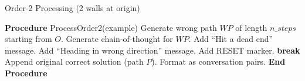 \begin{algorithm}
\caption{Order-2 Processing (2 walls at origin)}
\label{alg:order2}
\begin{algorithmic}[1]
\STATE \textbf{Procedure} ProcessOrder2(example)
        \STATE Generate wrong path $WP$ of length $n\_steps$ starting from $O$.
            \STATE Generate chain-of-thought for $WP$.
                \STATE Add ``Hit a dead end'' message.
            \ELSE
                \STATE Add ``Heading in wrong direction'' message.
            \ENDIF
            \STATE Add RESET marker.
            \STATE \textbf{break}
        \ENDIF
    \ENDFOR
    \STATE Append original correct solution (path $P$).
    \STATE Format as conversation pairs.
\STATE \textbf{End Procedure}
\end{algorithmic}
\end{algorithm}

